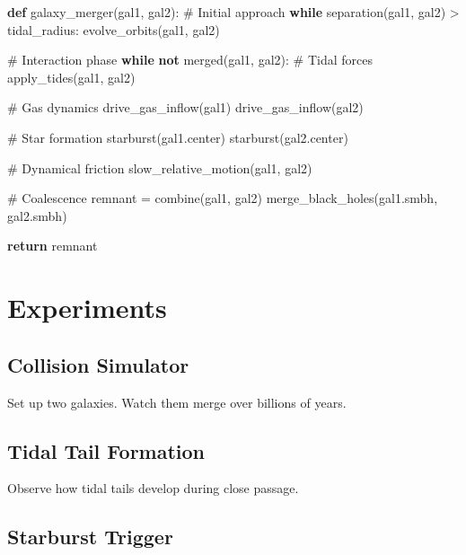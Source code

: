 \documentclass[
  11pt,
  letterpaper,
  twoside,
  openright]{book}
\newenvironment{Shaded}{\begin{snugshade}}{\end{snugshade}}
\newcommand{\CommentTok}[1]{\textcolor[rgb]{0.37,0.37,0.37}{#1}}
\newcommand{\ControlFlowTok}[1]{\textcolor[rgb]{0.00,0.23,0.31}{\textbf{#1}}}
\newcommand{\KeywordTok}[1]{\textcolor[rgb]{0.00,0.23,0.31}{\textbf{#1}}}
\newcommand{\NormalTok}[1]{\textcolor[rgb]{0.00,0.23,0.31}{#1}}
\newcommand{\OperatorTok}[1]{\textcolor[rgb]{0.37,0.37,0.37}{#1}}
\begin{document}
\begin{Shaded}
\begin{Highlighting}[]
\KeywordTok{def}\NormalTok{ galaxy\_merger(gal1, gal2):}
    \CommentTok{\# Initial approach}
    \ControlFlowTok{while}\NormalTok{ separation(gal1, gal2) }\OperatorTok{\textgreater{}}\NormalTok{ tidal\_radius:}
\NormalTok{        evolve\_orbits(gal1, gal2)}

    \CommentTok{\# Interaction phase}
    \ControlFlowTok{while} \KeywordTok{not}\NormalTok{ merged(gal1, gal2):}
        \CommentTok{\# Tidal forces}
\NormalTok{        apply\_tides(gal1, gal2)}

        \CommentTok{\# Gas dynamics}
\NormalTok{        drive\_gas\_inflow(gal1)}
\NormalTok{        drive\_gas\_inflow(gal2)}

        \CommentTok{\# Star formation}
\NormalTok{        starburst(gal1.center)}
\NormalTok{        starburst(gal2.center)}

        \CommentTok{\# Dynamical friction}
\NormalTok{        slow\_relative\_motion(gal1, gal2)}

    \CommentTok{\# Coalescence}
\NormalTok{    remnant }\OperatorTok{=}\NormalTok{ combine(gal1, gal2)}
\NormalTok{    merge\_black\_holes(gal1.smbh, gal2.smbh)}

    \ControlFlowTok{return}\NormalTok{ remnant}
\end{Highlighting}
\end{Shaded}

\section{Experiments}\label{experiments-27}

\subsection{Collision Simulator}\label{collision-simulator-1}

Set up two galaxies. Watch them merge over billions of years.

\subsection{Tidal Tail Formation}\label{tidal-tail-formation}

Observe how tidal tails develop during close passage.

\subsection{Starburst Trigger}\label{starburst-trigger}
\end{document}
